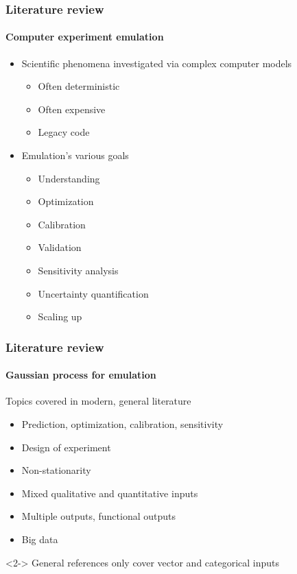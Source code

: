 \documentclass{snedecorbeamer}
\begin{document}
\begin{frame}
  \frametitle{Literature review}
  \framesubtitle{Computer experiment emulation}

  \begin{itemize}
  \item<2-> Scientific phenomena investigated via complex computer
    models~\citep{sacks1989,currin1991,koehler1996}
    \begin{itemize}
    \item Often deterministic
    \item Often expensive
    \item Legacy code
    \end{itemize}
  \item<3-> Emulation's various goals
    \begin{itemize}
    \item Understanding
    \item Optimization~\citep{jones1998,ohagan1992}
    \item Calibration~\citep{higdon2008,higdon2008a,kennedy2001}
    \item Validation~\citep{bayarri2007}
    \item Sensitivity analysis~\citep{campbell2006,iooss2009,morris2018}
    \item Uncertainty quantification
    \item Scaling up
    \end{itemize}
  \end{itemize}
\end{frame}

\begin{frame}
  \frametitle{Literature review}
  \framesubtitle{Gaussian process for emulation}

  Topics covered in modern, general
  literature~\citep{santner2003,santner2018,gramacy2020}
  \begin{itemize}
  \item Prediction, optimization, calibration, sensitivity
  \item Design of experiment
  \item Non-stationarity
  \item Mixed qualitative and quantitative inputs
  \item Multiple outputs, functional outputs
  \item Big data
  \end{itemize}

  \vfill{}
  \begin{exampleblock}{}<2->
    General references only cover vector and categorical inputs
  \end{exampleblock}
\end{frame}
\end{document}
